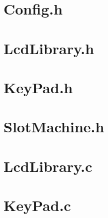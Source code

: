 \documentclass[a4paper,13pt,openany,sffamily]{memoir}
\begin{document}
\section{Config.h}
\begin{small}

\end{small}

\newpage
\section{LcdLibrary.h}
\begin{small}

\end{small}

\newpage
\section{KeyPad.h}
\begin{small}

\end{small}

\newpage
\section{SlotMachine.h}
\begin{small}

\end{small}


\newpage
\section{LcdLibrary.c}
\begin{small}

\end{small}


\newpage
\section{KeyPad.c}
\begin{small}

\end{small}
\end{document}
